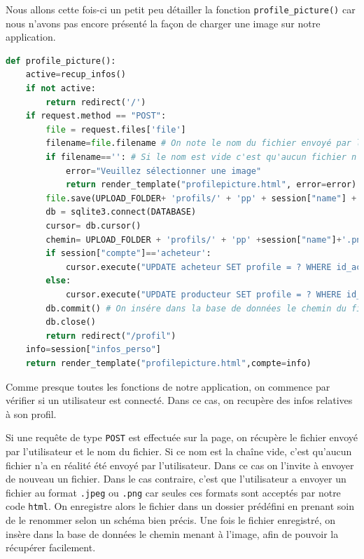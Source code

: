 \documentclass[11pt]{article}
\begin{document}
Nous allons cette fois-ci un petit peu détailler la fonction \texttt{profile\_picture()} car nous n'avons pas encore présenté la façon de charger une image sur notre application.

\begin{lstlisting}[language=python, caption={Fonction Python \texttt{profile\_picture.html}}]
def profile_picture():
    active=recup_infos()
    if not active:
        return redirect('/')
    if request.method == "POST":
        file = request.files['file']
        filename=file.filename # On note le nom du fichier envoyé par l'utilisateur
        if filename=='': # Si le nom est vide c'est qu'aucun fichier n'a été envoyé
            error="Veuillez sélectionner une image"
            return render_template("profilepicture.html", error=error)
        file.save(UPLOAD_FOLDER+ 'profils/' + 'pp' + session["name"] + '.png') # On enregistre le fichier en le renommant
        db = sqlite3.connect(DATABASE)
        cursor= db.cursor()
        chemin= UPLOAD_FOLDER + 'profils/' + 'pp' +session["name"]+'.png'
        if session["compte"]=='acheteur':
            cursor.execute("UPDATE acheteur SET profile = ? WHERE id_acheteur = ?", (chemin, session["name"]))
        else:
            cursor.execute("UPDATE producteur SET profile = ? WHERE id_producteur = ?", (chemin, session["name"]))
        db.commit() # On insére dans la base de données le chemin du fichier
        db.close()
        return redirect("/profil")
    info=session["infos_perso"]
    return render_template("profilepicture.html",compte=info)
\end{lstlisting}

Comme presque toutes les fonctions de notre application, on commence par vérifier si un utilisateur est connecté. Dans ce cas, on recupère des infos relatives à son profil.

Si une requête de type \texttt{POST} est effectuée sur la page, on récupère le fichier envoyé par l'utilisateur et le nom du fichier. Si ce nom est la chaîne vide, c'est qu'aucun fichier n'a en réalité été envoyé par l'utilisateur. Dans ce cas on l'invite à envoyer de nouveau un fichier. Dans le cas contraire, c'est que l'utilisateur a envoyer un fichier au format \texttt{.jpeg} ou \texttt{.png} car seules ces formats sont acceptés par notre code \texttt{html}. On enregistre alors le fichier dans un dossier prédéfini en prenant soin de le renommer selon un schéma bien précis. Une fois le fichier enregistré, on insère dans la base de données le chemin menant à l'image, afin de pouvoir la récupérer facilement.
\end{document}
